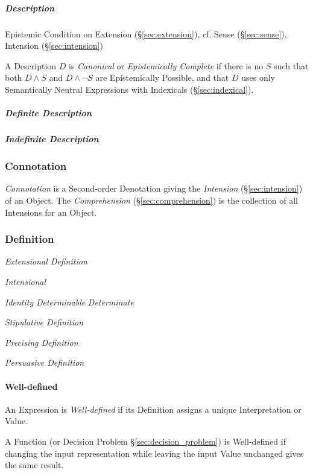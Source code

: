 \subparagraph{Description}\label{sec:description}\hfill
\cite{chalmers02}

Epistemic Condition on Extension (\S\ref{sec:extension}), cf. Sense
(\S\ref{sec:sense}), Intension (\S\ref{sec:intension})

A Description $D$ is \emph{Canonical} or \emph{Epistemically Complete}
if there is no $S$ such that both $D \wedge S$ and $D \wedge \neg S$
are Epistemically Possible, and that $D$ uses only Semantically
Neutral Expressions with Indexicals (\S\ref{sec:indexical}).

\subparagraph{Definite Description}\label{sec:definite_description}\hfill

\subparagraph{Indefinite Description}\label{sec:indefinite_description}\hfill



\subsubsection{Connotation}\label{sec:connotation}

\emph{Connotation} is a Second-order Denotation giving the
\emph{Intension} (\S\ref{sec:intension}) of an Object. The
\emph{Comprehension} (\S\ref{sec:comprehension}) is the collection of
all Intensions for an Object.



\subsubsection{Definition}\label{sec:definition}

\emph{Extensional Definition}

\emph{Intensional}

\emph{Identity} \emph{Determinable} \emph{Determinate}

\emph{Stipulative Definition}

\emph{Precising Definition}

\emph{Persuasive Definition}



\paragraph{Well-defined}\label{sec:well_defined}\hfill

An Expression is \emph{Well-defined} if its Definition assigns a
unique Interpretation or Value.

A Function (or Decision Problem \S\ref{sec:decision_problem}) is
Well-defined if changing the input representation while leaving the
input Value unchanged gives the same result. %



